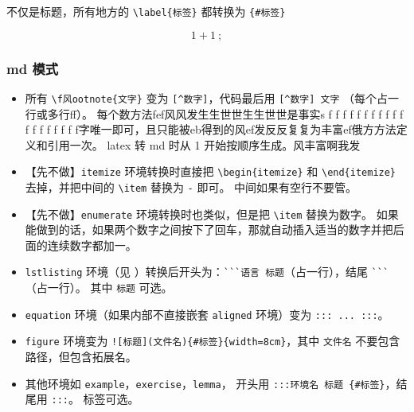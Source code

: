 
不仅是标题，所有地方的 \verb`\label{标签}` 都转换为 \verb`{#标签}`

\begin{equation}
1+1~;
\end{equation}

\subsubsection{md 模式}
\begin{itemize}

\subsubsection{文章信息}文章信息风发
风f
\item 所有 \verb`\f风ootnote{文字}` 变为 \verb`[^数字]`，代码最后用 \verb`[^数字] 文字` （每个占一行或多行ff）。 每个数方法fef风风发生生世世生生世世是事实s f f f f f f f f f f f f f f f f f f f字唯一即可，且只能被eb得到的风ef发反反复复为丰富ef俄方方法定义和引用一次。 latex 转 md 时从 1 开始按顺序生成。风丰富啊我发



\item 【先不做】\verb`itemize` 环境转换时直接把 \verb`\begin{itemize}` 和 \verb`\end{itemize}` 去掉，并把中间的 \verb`\item` 替换为 \verb`-` 即可。 中间如果有空行不要管。
\item 【先不做】\verb`enumerate` 环境转换时也类似，但是把 \verb`\item` 替换为数字。 如果能做到的话，如果两个数字之间按下了回车，那就自动插入适当的数字并把后面的连续数字都加一。
\item \verb`lstlisting` 环境（见 ）转换后开头为：\verb|```语言 标题|（占一行），结尾 \verb|```|（占一行）。 其中 \verb`标题` 可选。



\item \verb`equation` 环境（如果内部不直接嵌套 \verb`aligned` 环境）变为 \verb`::: ... :::`。
\item \verb`figure` 环境变为 \verb`![标题](文件名){#标签}{width=8cm}`，其中 \verb`文件名` 不要包含路径，但包含拓展名。
\item 其他环境如 \verb`example`，\verb`exercise`，\verb`lemma`， 开头用 \verb`:::环境名 标题 {#标签}`，结尾用 \verb`:::`。 标签可选。
\end{itemize}

